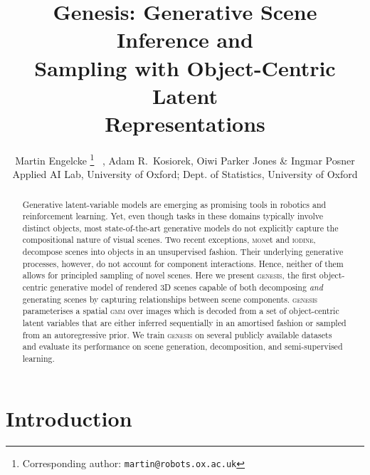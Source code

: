 \documentclass{article}
\title{Genesis: Generative Scene Inference and\\ Sampling with Object-Centric Latent\\ Representations}
\author{
Martin Engelcke
\!\thanks{Corresponding author: \texttt{martin@robots.ox.ac.uk}}
\ , Adam R.~Kosiorek, Oiwi Parker Jones \& Ingmar Posner\\
 Applied AI Lab, University of Oxford; 
 Dept. of Statistics, University of Oxford
}
\begin{document}
\maketitle



\begin{abstract}




















Generative latent-variable models are emerging as promising tools in robotics and reinforcement learning. Yet, even though tasks in these domains typically involve distinct objects, most state-of-the-art generative models do not explicitly capture the compositional nature of visual scenes. Two recent exceptions, \textsc{mon}et and \textsc{iodine}, decompose scenes into objects in an unsupervised fashion. Their underlying generative processes, however, do not account for component interactions. Hence, neither of them allows for principled sampling of novel scenes. Here we present \textsc{genesis}, the first  object-centric generative model of rendered 3D scenes capable of both decomposing \emph{and} generating scenes by capturing relationships between scene components. \textsc{genesis} parameterises a spatial \textsc{gmm} over images which is decoded from a set of object-centric latent variables that are either inferred sequentially in an amortised fashion or sampled from an autoregressive prior. We train \textsc{genesis} on several publicly available datasets and evaluate its performance on scene generation, decomposition, and semi-supervised learning. \end{abstract}



\section{Introduction}
\label{sec:introduction}
\end{document}
